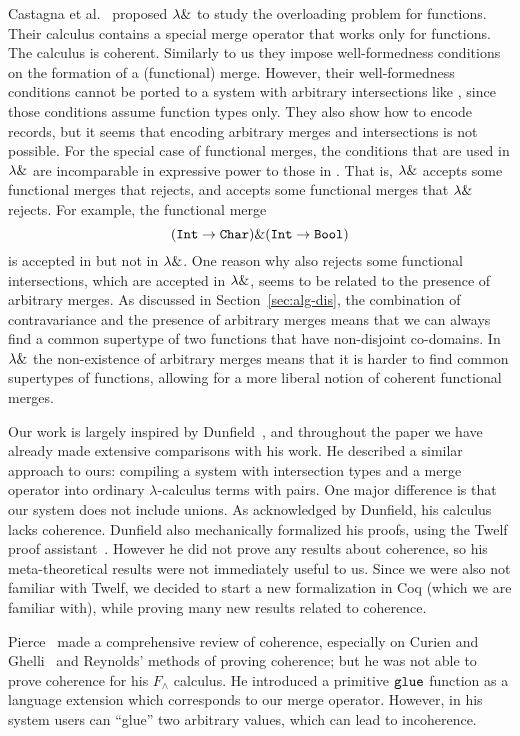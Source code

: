 Castagna et al.~\cite{Castagna92calculus} proposed $\lambda \&$ to study
the overloading problem for functions. Their calculus contains a special merge operator that works only for
functions. The calculus is coherent. Similarly to us they impose
well-formedness conditions on the formation of a (functional)
merge. However, their well-formedness conditions cannot be ported to a
system with arbitrary intersections like \name, since those conditions
assume function types only.  They also show how to encode records, but
it seems that encoding arbitrary merges and intersections is not
possible.  For the special case of functional
merges, the conditions that are used in $\lambda \&$ are incomparable in
expressive power to those in \name. That is, $\lambda \&$ accepts some
functional merges that \name rejects, and \name accepts some
functional merges that $\lambda \&$ rejects. For example, the functional
merge
\[(\texttt{Int}\to\texttt{Char})\&(\texttt{Int}\to\texttt{Bool})\] 
\noindent is accepted in \name but not in $\lambda \&$. One reason 
why \name also rejects some functional intersections, which are 
accepted in $\lambda \&$, seems to be related to the presence of arbitrary 
merges. As discussed in Section~\ref{sec:alg-dis}, the combination of
contravariance and the presence of arbitrary merges means that we can
always find a common supertype of two functions that have non-disjoint
co-domains. In $\lambda \&$ the non-existence of arbitrary merges means
that it is harder to find common supertypes of functions, allowing for
a more liberal notion of coherent functional merges.  

Our work is largely inspired by
Dunfield~\cite{dunfield2014elaborating}, and throughout the paper we
have already made extensive comparisons with his work. He
described a similar approach to ours: compiling a system with intersection types
and a merge operator into ordinary $ \lambda $-calculus terms with pairs. One
major difference is that our system does not include unions. As
acknowledged by Dunfield, his calculus lacks coherence. Dunfield
also mechanically formalized his proofs, using the Twelf proof
assistant~\cite{Pfenning99cade}. However he did not prove any results about
coherence, so his meta-theoretical results were not immediately
useful to us. Since we were also not familiar with Twelf, we decided to
start a new formalization in Coq (which we are familiar with), while
proving many new results related to coherence.


Pierce~\cite{pierce1991programming2} made a comprehensive review
of coherence, especially on Curien and Ghelli~\cite{curienl1990coherence} and
Reynolds' methods of proving coherence; but he was not able to prove coherence
for his $F_\wedge$ calculus. He introduced a primitive $\texttt{glue}$ function as
a language extension which corresponds to our merge operator. However, in his
system users can ``glue'' two arbitrary values, which can lead to incoherence.

